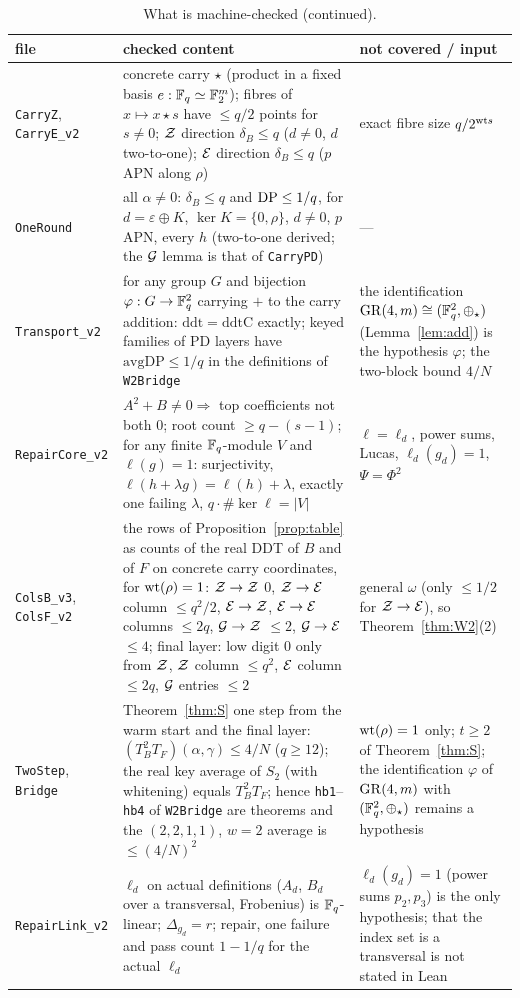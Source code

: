 \begin{table}[!htbp]\footnotesize
\caption{What is machine-checked (continued).}\label{tab:lean2}
\begin{tabular}{p{}p{}p{}}
\toprule
file & checked content & not covered / input\\
\midrule
\texttt{CarryZ}, \texttt{CarryE\_v2} & concrete carry $\star$ (product in a fixed basis $e:\mathbb{F}_q\simeq\mathbb{F}_2^m$); fibres of $x\mapsto x\star s$ have $\le q/2$ points for $s\ne0$; $\mathcal{Z}$ direction $\delta_B\le q$ ($d\ne0$, $d$ two-to-one); $\mathcal{E}$ direction $\delta_B\le q$ ($p$ APN along $\rho$) & exact fibre size $q/2^{\mathrm{wt} s}$\\
\texttt{OneRound} & all $\alpha\ne0$: $\delta_B\le q$ and $\mathrm{DP}\le1/q$, for $d=\varepsilon\oplus K$, $\ker K=\{0,\rho\}$, $d\ne0$, $p$ APN, every $h$ (two-to-one derived; the $\mathcal{G}$ lemma is that of \texttt{CarryPD}) & ---\\
\texttt{Transport\_v2} & for any group $G$ and bijection $\varphi:G\to\mathbb{F}_q^2$ carrying $+$ to the carry addition: $\mathrm{ddt}=\mathrm{ddtC}$ exactly; keyed families of PD layers have $\mathrm{avgDP}\le1/q$ in the definitions of \texttt{W2Bridge} & the identification $\mathrm{GR}(4,m)\cong(\mathbb{F}_q^2,\oplus_\star)$ (Lemma~\ref{lem:add}) is the hypothesis $\varphi$; the two-block bound $4/N$\\
\texttt{RepairCore\_v2} & $A^2+B\ne0\Rightarrow$ top coefficients not both $0$; root count $\ge q-(s-1)$; for any finite $\mathbb{F}_q$-module $V$ and $\ell(g)=1$: surjectivity, $\ell(h+\lambda g)=\ell(h)+\lambda$, exactly one failing $\lambda$, $q\cdot\#\ker\ell=|V|$ & $\ell=\ell_d$, power sums, Lucas, $\ell_d(g_d)=1$, $\Psi=\Phi^2$\\
\texttt{ColsB\_v3}, \texttt{ColsF\_v2} & the rows of Proposition~\ref{prop:table} as counts of the real DDT of $B$ and of $F$ on concrete carry coordinates, for $\mathrm{wt}(\rho)=1$: $\mathcal{Z}\to\mathcal{Z}$ $0$, $\mathcal{Z}\to\mathcal{E}$ column $\le q^2/2$, $\mathcal{E}\to\mathcal{Z}$, $\mathcal{E}\to\mathcal{E}$ columns $\le2q$, $\mathcal{G}\to\mathcal{Z}$ $\le2$, $\mathcal{G}\to\mathcal{E}$ $\le4$; final layer: low digit $0$ only from $\mathcal{Z}$, $\mathcal{Z}$ column $\le q^2$, $\mathcal{E}$ column $\le2q$, $\mathcal{G}$ entries $\le2$ & general $\omega$ (only $\le1/2$ for $\mathcal{Z}\to\mathcal{E}$), so Theorem~\ref{thm:W2}(2)\\
\texttt{TwoStep}, \texttt{Bridge} & Theorem~\ref{thm:S} one step from the warm start and the final layer: $(T_B^2T_F)(\alpha,\gamma)\le4/N$ ($q\ge12$); the real key average of $S_2$ (with whitening) equals $T_B^2T_F$; hence \texttt{hb1}--\texttt{hb4} of \texttt{W2Bridge} are theorems and the $(2,2,1,1)$, $w=2$ average is $\le(4/N)^2$ & $\mathrm{wt}(\rho)=1$ only; $t\ge2$ of Theorem~\ref{thm:S}; the identification $\varphi$ of $\mathrm{GR}(4,m)$ with $(\mathbb{F}_q^2,\oplus_\star)$ remains a hypothesis\\
\texttt{RepairLink\_v2} & $\ell_d$ on actual definitions ($A_d$, $B_d$ over a transversal, Frobenius) is $\mathbb{F}_q$-linear; $\Delta_{g_d}=r$; repair, one failure and pass count $1-1/q$ for the actual $\ell_d$ & $\ell_d(g_d)=1$ (power sums $p_2,p_3$) is the only hypothesis; that the index set is a transversal is not stated in Lean\\
\bottomrule
\end{tabular}
\end{table}

